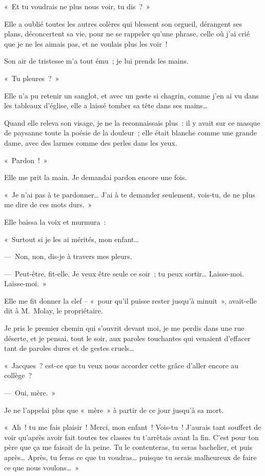 \documentclass[french,twoside]{book} %
\begin{document}
\noindent « Et tu voudrais ne plus nous voir, tu dis ? »\par
Elle a oublié toutes les autres colères qui blessent son orgueil, dérangent ses plans, déconcertent sa vie, pour ne se rappeler qu’une phrase, celle où j’ai crié que je ne les aimais pas, et ne voulais plus les voir !\par
Son air de tristesse m’a tout ému ; je lui prends les mains.\par
« Tu pleures ? »\par
Elle n’a pu retenir un sanglot, et avec un geste si chagrin, comme j’en ai vu dans les tableaux d’église, elle a laissé tomber sa tête dans ses mains…\par
Quand elle releva son visage, je ne la reconnaissais plus : il y avait sur ce masque de paysanne toute la poésie de la douleur ; elle était blanche comme une grande dame, avec des larmes comme des perles dans les yeux.\par
« Pardon ! »\par
Elle me prit la main. Je demandai pardon encore une fois.\par
« Je n’ai pas à te pardonner… J’ai à te demander seulement, vois-tu, de ne plus me dire de ces mots durs. »\par
Elle baissa la voix et murmura :\par
« Surtout si je les ai mérités, mon enfant…\par
— Non, non, dis-je à travers mes pleurs.\par
— Peut-être, fit-elle. Je veux être seule ce soir ; tu peux sortir… Laisse-moi. Laisse-moi. »\par
Elle me fit donner la clef – « pour qu’il puisse rester jusqu’à minuit », avait-elle dit à M. Molay, le propriétaire.\par
Je pris le premier chemin qui s’ouvrit devant moi, je me perdis dans une rue déserte, et je pensai, tout le soir, aux paroles touchantes qui venaient d’effacer tant de paroles dures et de gestes cruels…\par
\bigbreak
\noindent « Jacques ? est-ce que tu veux nous accorder cette grâce d’aller encore au collège ?\par
— Oui, mère. »\par
Je ne l’appelai plus que « mère » à partir de ce jour jusqu’à sa mort.\par
« Ah ! tu me fais plaisir ! Merci, mon enfant ! Vois-tu ! J’aurais tant souffert de voir qu’après avoir fait toutes tes classes tu t’arrêtais avant la fin. C’est pour ton père que ça me faisait de la peine. Tu le contenteras, tu seras bachelier, et puis après… Après, tu feras ce que tu voudras… puisque tu serais malheureux de faire ce que nous voulons… »\par
\end{document}

